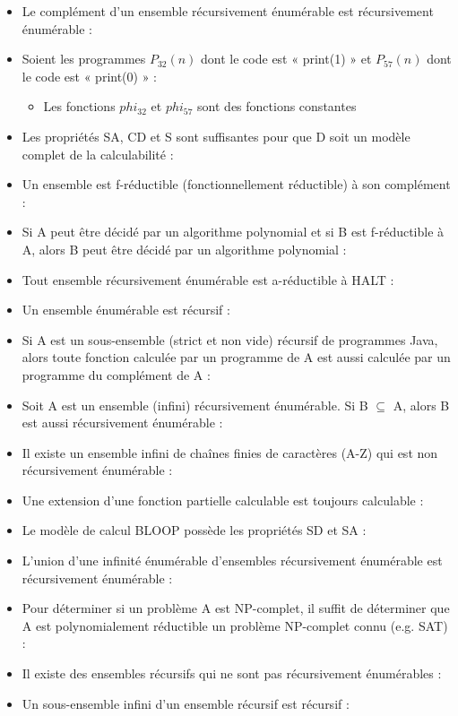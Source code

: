 \begin{itemize}
\item Le complément d’un ensemble récursivement énumérable est récursivement énumérable :  %
\item Soient les programmes $P_{32}(n)$ dont le code est « print(1) » et $P_{57}(n)$ dont le code est « print(0) » : %
	\begin{itemize}
	\item Les fonctions $phi_{32}$ et $phi_{57}$ sont des fonctions constantes
	\end{itemize}
\item Les propriétés SA, CD et S sont suffisantes pour que D soit un modèle complet de la calculabilité :  %
\item Un ensemble est f-réductible (fonctionnellement réductible) à son complément :  %
\item Si A peut être décidé par un algorithme polynomial et si B est f-réductible à A, alors B peut être décidé par un algorithme polynomial :  %
\item Tout ensemble récursivement énumérable est a-réductible à HALT :  %
\item Un ensemble énumérable est récursif :  %
\item Si A est un sous-ensemble (strict et non vide) récursif de programmes Java, alors toute fonction calculée par un programme de A est aussi calculée par un programme du complément de A :  %
\item Soit A est un ensemble (infini) récursivement énumérable. Si B $\subseteq$ A, alors B est aussi récursivement énumérable :  %
\item Il existe un ensemble infini de chaînes finies de caractères (A-Z) qui est non récursivement énumérable :  %
\item Une extension d’une fonction partielle calculable est toujours calculable :  %
\item Le modèle de calcul BLOOP possède les propriétés SD et SA :  %
\item L’union d’une infinité énumérable d’ensembles récursivement énumérable est récursivement énumérable :  %
\item Pour déterminer si un problème A est NP-complet, il suffit de déterminer que A est polynomialement réductible un problème NP-complet connu (e.g. SAT) :  %
\item Il existe des ensembles récursifs qui ne sont pas récursivement énumérables :  %
\item Un sous-ensemble infini d’un ensemble récursif est récursif :  %
\end{itemize}

